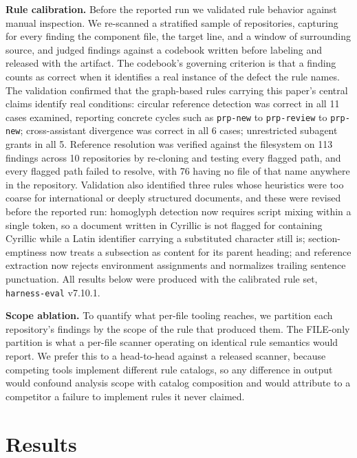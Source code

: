 \documentclass[conference]{IEEEtran}
\begin{document}
\textbf{Rule calibration.} Before the reported run we validated rule behavior
against manual inspection. We re-scanned a stratified sample of repositories,
capturing for every finding the component file, the target line, and a window of
surrounding source, and judged findings against a codebook written before
labeling and released with the artifact. The codebook's governing criterion is
that a finding counts as correct when it identifies a real instance of the
defect the rule names. The validation confirmed that the graph-based rules
carrying this paper's central claims identify real conditions: circular
reference detection was correct in all 11 cases examined, reporting concrete
cycles such as \texttt{prp-new} to \texttt{prp-review} to \texttt{prp-new};
cross-assistant divergence was correct in all 6 cases; unrestricted subagent
grants in all 5. Reference resolution was verified against the filesystem on 113
findings across 10 repositories by re-cloning and testing every flagged path,
and every flagged path failed to resolve, with 76 having no file of that name
anywhere in the repository. Validation also identified three rules whose
heuristics were too coarse for international or deeply structured documents, and
these were revised before the reported run: homoglyph detection now requires
script mixing within a single token, so a document written in Cyrillic is not
flagged for containing Cyrillic while a Latin identifier carrying a substituted
character still is; section-emptiness now treats a subsection as content for its
parent heading; and reference extraction now rejects environment assignments and
normalizes trailing sentence punctuation. All results below were produced with
the calibrated rule set, \texttt{harness-eval} v7.10.1.

\textbf{Scope ablation.} To quantify what per-file tooling reaches, we partition
each repository's findings by the scope of the rule that produced them. The
FILE-only partition is what a per-file scanner operating on identical rule
semantics would report. We prefer this to a head-to-head against a released
scanner, because competing tools implement different rule catalogs, so any
difference in output would confound analysis scope with catalog composition and
would attribute to a competitor a failure to implement rules it never claimed.

\section{Results}
\label{sec:results}
\end{document}
